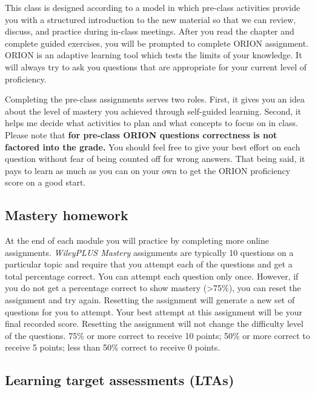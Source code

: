 This class is designed according to a model in which pre-class
activities provide you with a structured introduction to the new
material so that we can review, discuss, and practice during in-class
meetings. After you read the chapter and complete guided exercises, you
will be prompted to complete ORION assignment. ORION is an adaptive
learning tool which tests the limits of your knowledge. It will always
try to ask you questions that are appropriate for your current level of
proficiency.

Completing the pre-class assignments serves two roles. First, it gives
you an idea about the level of mastery you achieved through self-guided
learning. Second, it helps me decide what activities to plan and what
concepts to focus on in class. Please note that \textbf{for pre-class
ORION questions correctness is not factored into the grade.} You should
feel free to give your best effort on each question without fear of
being counted off for wrong answers. That being said, it pays to learn
as much as you can on your own to get the ORION proficiency score on a
good start.

\hypertarget{mastery-homework}{%
\subsection{Mastery homework}\label{mastery-homework}}

At the end of each module you will practice by completing more online
assignments. \emph{WileyPLUS Mastery} assignments are typically 10
questions on a particular topic and require that you attempt each of the
questions and get a total percentage correct. You can attempt each
question only once. However, if you do not get a percentage correct to
show mastery (\textgreater75\%), you can reset the assignment and try
again. Resetting the assignment will generate a new set of questions for
you to attempt. Your best attempt at this assignment will be your final
recorded score. Resetting the assignment will not change the difficulty
level of the questions. 75\% or more correct to receive 10 points; 50\%
or more correct to receive 5 points; less than 50\% correct to receive 0
points.

\hypertarget{learning-target-assessments-ltas}{%
\subsection{Learning target assessments
(LTAs)}\label{learning-target-assessments-ltas}}


